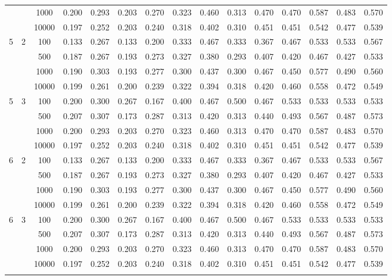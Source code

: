 \documentclass[12pt]{article}
\begin{document}
{\begin{longtable}{ccccccccccccccc}
      &   & 1000 & 0.200 & 0.293 & 0.203 & 0.270 & 0.323 & 0.460 & 0.313 & 0.470 & 0.470 & 0.587 & 0.483 & 0.570 \\
      &   & 10000 & 0.197 & 0.252 & 0.203 & 0.240 & 0.318 & 0.402 & 0.310 & 0.451 & 0.451 & 0.542 & 0.477 & 0.539 \\
    \hline
    5 & 2 & 100 & 0.133 & 0.267 & 0.133 & 0.200 & 0.333 & 0.467 & 0.333 & 0.367 & 0.467 & 0.533 & 0.533 & 0.567 \\
      &   & 500 & 0.187 & 0.267 & 0.193 & 0.273 & 0.327 & 0.380 & 0.293 & 0.407 & 0.420 & 0.467 & 0.427 & 0.533 \\
      &   & 1000 & 0.190 & 0.303 & 0.193 & 0.277 & 0.300 & 0.437 & 0.300 & 0.467 & 0.450 & 0.577 & 0.490 & 0.560 \\
      &   & 10000 & 0.199 & 0.261 & 0.200 & 0.239 & 0.322 & 0.394 & 0.318 & 0.420 & 0.460 & 0.558 & 0.472 & 0.549 \\
    \hline
    5 & 3 & 100 & 0.200 & 0.300 & 0.267 & 0.167 & 0.400 & 0.467 & 0.500 & 0.467 & 0.533 & 0.533 & 0.533 & 0.533 \\
      &   & 500 & 0.207 & 0.307 & 0.173 & 0.287 & 0.313 & 0.420 & 0.313 & 0.440 & 0.493 & 0.567 & 0.487 & 0.573 \\
      &   & 1000 & 0.200 & 0.293 & 0.203 & 0.270 & 0.323 & 0.460 & 0.313 & 0.470 & 0.470 & 0.587 & 0.483 & 0.570 \\
      &   & 10000 & 0.197 & 0.252 & 0.203 & 0.240 & 0.318 & 0.402 & 0.310 & 0.451 & 0.451 & 0.542 & 0.477 & 0.539 \\
    \hline
    6 & 2 & 100 & 0.133 & 0.267 & 0.133 & 0.200 & 0.333 & 0.467 & 0.333 & 0.367 & 0.467 & 0.533 & 0.533 & 0.567 \\
      &   & 500 & 0.187 & 0.267 & 0.193 & 0.273 & 0.327 & 0.380 & 0.293 & 0.407 & 0.420 & 0.467 & 0.427 & 0.533 \\
      &   & 1000 & 0.190 & 0.303 & 0.193 & 0.277 & 0.300 & 0.437 & 0.300 & 0.467 & 0.450 & 0.577 & 0.490 & 0.560 \\
      &   & 10000 & 0.199 & 0.261 & 0.200 & 0.239 & 0.322 & 0.394 & 0.318 & 0.420 & 0.460 & 0.558 & 0.472 & 0.549 \\
    \hline
    6 & 3 & 100 & 0.200 & 0.300 & 0.267 & 0.167 & 0.400 & 0.467 & 0.500 & 0.467 & 0.533 & 0.533 & 0.533 & 0.533 \\
      &   & 500 & 0.207 & 0.307 & 0.173 & 0.287 & 0.313 & 0.420 & 0.313 & 0.440 & 0.493 & 0.567 & 0.487 & 0.573 \\
      &   & 1000 & 0.200 & 0.293 & 0.203 & 0.270 & 0.323 & 0.460 & 0.313 & 0.470 & 0.470 & 0.587 & 0.483 & 0.570 \\
      &   & 10000 & 0.197 & 0.252 & 0.203 & 0.240 & 0.318 & 0.402 & 0.310 & 0.451 & 0.451 & 0.542 & 0.477 & 0.539 \\
    \hline
    \label{tab:misclassification_errors}
\end{longtable}
}
\end{document}
